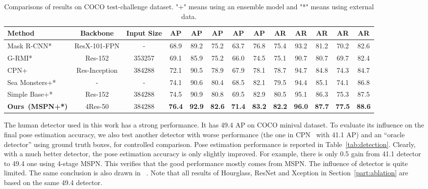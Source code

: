 \documentclass[10pt,twocolumn,letterpaper]{article}
\begin{document}
\begin{table*}[t]
	\begin{spacing}{1.05}
		\begin{center}
			\renewcommand\tabcolsep{4.0pt}
			\begin{tabular}{l|c|c|c c c c c c c c c c}
				\hline
				Method & Backbone & Input Size & AP & AP & AP & AP & AP & AR & AR & AR & AR & AR\\
				\hline
				Mask R-CNN*~\cite{he2017mask} & ResX-101-FPN & - & 68.9 & 89.2 & 75.2 & 63.7 & 76.8 & 75.4 & 93.2 & 81.2 & 70.2 & 82.6\\
				G-RMI*~\cite{papandreou2017towards} & Res-152 & 353257 & 69.1 & 85.9 & 75.2 & 66.0 & 74.5 & 75.1 & 90.7 & 80.7 & 69.7 & 82.4\\
				CPN+~\cite{chen2018cascaded} & Res-Inception & 384288 & 72.1 & 90.5 & 78.9 & 67.9 & 78.1 & 78.7 & 94.7 & 84.8 & 74.3 & 84.7\\
				Sea Monsters+* & - & - & 74.1 & 90.6 & 80.4 & 68.5 & 82.1 & 79.5 & 94.4 & 85.1 & 74.1 & 86.8\\
				Simple Base+*~\cite{xiao2018simple} & Res-152 & 384288 & 74.5 & 90.9 & 80.8 & 69.5 & 82.9 & 80.5 & 95.1 & 86.3 & 75.3 & 87.5\\
				\textbf{Ours~(MSPN+*)} & 4Res-50 & 384288 & \textbf{76.4} & \textbf{92.9} & \textbf{82.6} & \textbf{71.4} & \textbf{83.2} & \textbf{82.2} & \textbf{96.0} & \textbf{87.7} & \textbf{77.5} & \textbf{88.6}\\
				\hline
			\end{tabular}
		\end{center}
		\caption{Comparisons of results on COCO test-challenge dataset. "+" means using an ensemble model and "*" means using external data.}
		\label{tab:test-challenge}
	\end{spacing}
\end{table*}

The human detector used in this work has a strong performance. It has 49.4 AP on COCO minival dataset. To evaluate its influence on the final pose estimation accuracy, we also test another detector with worse performance (the one in CPN~\cite{chen2018cascaded} with 41.1 AP) and an ``oracle detector'' using ground truth boxes, for controlled comparison. Pose estimation performance is reported in Table~\ref{tab:detection}. Clearly, with a much better detector, the pose estimation accuracy is only slightly improved. For example, there is only 0.5 gain from 41.1 detector to 49.4 one using 4-stage MSPN. This verifies that the good performance mostly comes from MSPN. The influence of detector is quite limited. The same conclusion is also drawn in ~\cite{chen2018cascaded}. Note that all results of Hourglass, ResNet and Xception in Section~\ref{part:ablation} are based on the same 49.4 detector.
\end{document}
